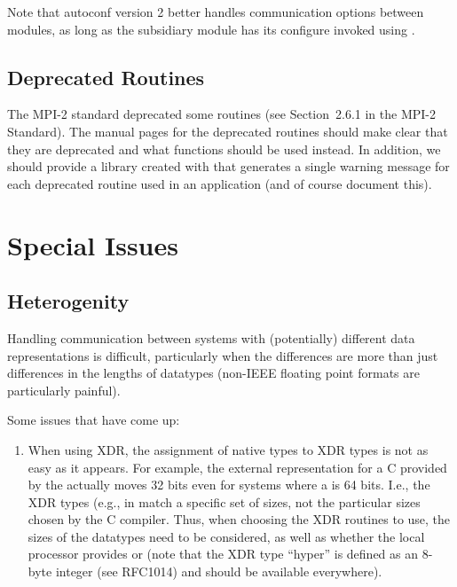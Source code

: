 \documentclass{article}
\begin{document}
Note that autoconf version 2 better handles communication options between
modules, as long as the subsidiary module has its configure invoked using
.  

\subsection{Deprecated Routines}

The MPI-2 standard deprecated some routines (see Section~2.6.1 in the MPI-2
Standard).  The manual pages for the deprecated routines should make clear
that they are deprecated and what functions should be used instead.  In
addition, we should provide a library created with  that
generates a single warning message for each deprecated routine used in an
application (and of course document this).




\section{Special Issues}
\label{sec:special-issues}

\subsection{Heterogenity}
\label{sec:hetero-issues}

Handling communication between systems with (potentially) different data
representations is difficult, particularly when the differences are more than
just differences in the lengths of datatypes (non-IEEE floating point formats
are particularly painful).

Some issues that have come up:
\begin{enumerate}
\item When using XDR, the assignment of native types to XDR types
  is not as easy as it appears.  For example, the external representation for
  a C  provided by the  actually moves 32 bits
  even for systems where a  is 64 bits.  I.e., the XDR types (e.g.,
  in  match a specific set of sizes, not the particular sizes
  chosen by the C compiler.  Thus, when choosing the XDR routines to use, the
  sizes of the datatypes need to be considered, as well as whether the local
  processor provides  or  (note that the
  XDR type ``hyper'' is defined as an 8-byte integer (see RFC1014) and should
  be available everywhere).

\end{enumerate}
\end{document}

